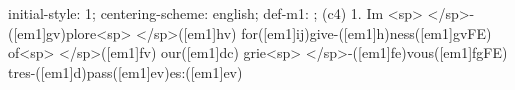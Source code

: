 initial-style: 1;
centering-scheme: english;
def-m1: \grealign;
(c4) 1. Im  <sp> </sp>-([em1]gv)plore<sp> </sp>([em1]hv) for([em1]ij)give-([em1]h)ness([em1]gvFE) of<sp> </sp>([em1]fv) our([em1]dc) grie<sp> </sp>-([em1]fe)vous([em1]fgFE) tres-([em1]d)pass([em1]ev)es:([em1]ev)